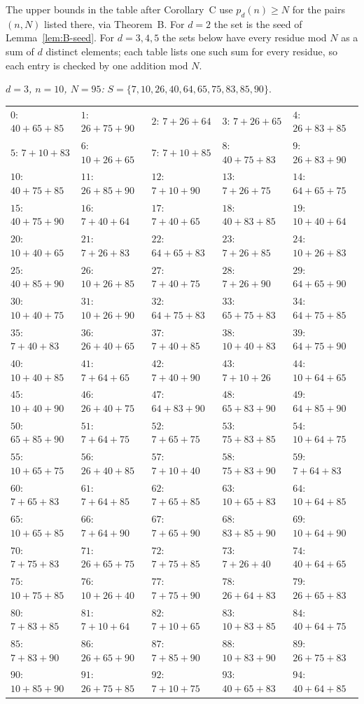 The upper bounds in the table after Corollary~C use $p_d(n) \ge N$ for the pairs $(n, N)$ listed there,
via Theorem~B. For $d = 2$ the set is the seed of Lemma~\ref{lem:B-seed}. For $d = 3, 4, 5$ the sets below
have every residue mod $N$ as a sum of $d$ distinct elements; each table lists one such sum for every
residue, so each entry is checked by one addition mod $N$.

\emph{$d = 3$, $n = 10$, $N = 95$:} $S = \{7, 10, 26, 40, 64, 65, 75, 83, 85, 90\}$.
\begin{center}\scriptsize
\begin{tabular}{lllll}
$0$: $40+65+85$ & $1$: $26+75+90$ & $2$: $7+26+64$ & $3$: $7+26+65$ & $4$: $26+83+85$\\
$5$: $7+10+83$ & $6$: $10+26+65$ & $7$: $7+10+85$ & $8$: $40+75+83$ & $9$: $26+83+90$\\
$10$: $40+75+85$ & $11$: $26+85+90$ & $12$: $7+10+90$ & $13$: $7+26+75$ & $14$: $64+65+75$\\
$15$: $40+75+90$ & $16$: $7+40+64$ & $17$: $7+40+65$ & $18$: $40+83+85$ & $19$: $10+40+64$\\
$20$: $10+40+65$ & $21$: $7+26+83$ & $22$: $64+65+83$ & $23$: $7+26+85$ & $24$: $10+26+83$\\
$25$: $40+85+90$ & $26$: $10+26+85$ & $27$: $7+40+75$ & $28$: $7+26+90$ & $29$: $64+65+90$\\
$30$: $10+40+75$ & $31$: $10+26+90$ & $32$: $64+75+83$ & $33$: $65+75+83$ & $34$: $64+75+85$\\
$35$: $7+40+83$ & $36$: $26+40+65$ & $37$: $7+40+85$ & $38$: $10+40+83$ & $39$: $64+75+90$\\
$40$: $10+40+85$ & $41$: $7+64+65$ & $42$: $7+40+90$ & $43$: $7+10+26$ & $44$: $10+64+65$\\
$45$: $10+40+90$ & $46$: $26+40+75$ & $47$: $64+83+90$ & $48$: $65+83+90$ & $49$: $64+85+90$\\
$50$: $65+85+90$ & $51$: $7+64+75$ & $52$: $7+65+75$ & $53$: $75+83+85$ & $54$: $10+64+75$\\
$55$: $10+65+75$ & $56$: $26+40+85$ & $57$: $7+10+40$ & $58$: $75+83+90$ & $59$: $7+64+83$\\
$60$: $7+65+83$ & $61$: $7+64+85$ & $62$: $7+65+85$ & $63$: $10+65+83$ & $64$: $10+64+85$\\
$65$: $10+65+85$ & $66$: $7+64+90$ & $67$: $7+65+90$ & $68$: $83+85+90$ & $69$: $10+64+90$\\
$70$: $7+75+83$ & $71$: $26+65+75$ & $72$: $7+75+85$ & $73$: $7+26+40$ & $74$: $40+64+65$\\
$75$: $10+75+85$ & $76$: $10+26+40$ & $77$: $7+75+90$ & $78$: $26+64+83$ & $79$: $26+65+83$\\
$80$: $7+83+85$ & $81$: $7+10+64$ & $82$: $7+10+65$ & $83$: $10+83+85$ & $84$: $40+64+75$\\
$85$: $7+83+90$ & $86$: $26+65+90$ & $87$: $7+85+90$ & $88$: $10+83+90$ & $89$: $26+75+83$\\
$90$: $10+85+90$ & $91$: $26+75+85$ & $92$: $7+10+75$ & $93$: $40+65+83$ & $94$: $40+64+85$
\end{tabular}
\end{center}

